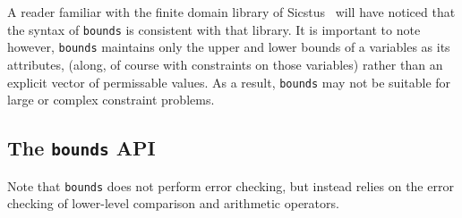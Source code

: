 A reader familiar with the finite domain library of
Sicstus~\cite{sicstus-manual} will have noticed that the syntax of
{\tt bounds} is consistent with that library.  It is important to note
however, {\tt bounds} maintains only the upper and lower bounds of a
variables as its attributes, (along, of course with constraints on
those variables) rather than an explicit vector of permissable values.
As a result, {\tt bounds} may not be suitable for large or complex
constraint problems.

\subsection{The {\tt bounds} API}

Note that {\tt bounds} does not perform error checking, but instead
relies on the error checking of lower-level comparison and arithmetic
operators.


